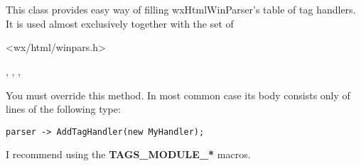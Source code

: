 %

\section{}\label{wxhtmltagsmodule}

This class provides easy way of filling wxHtmlWinParser's table of
tag handlers. It is used almost exclusively together with the set of




<wx/html/winpars.h>


,
,
,


\label{wxhtmltagsmodulefillhandlerstable}


You must override this method. In most common case its body consists
only of lines of the following type:

\begin{verbatim}
parser -> AddTagHandler(new MyHandler);
\end{verbatim}

I recommend using the {\bf TAGS\_MODULE\_*} macros.




